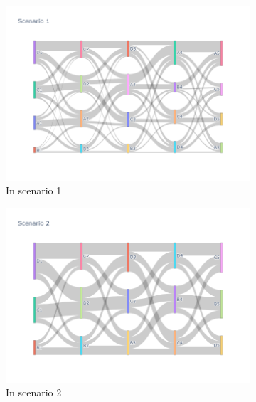 \iffalse
\begin{figure}[h]
  \begin{subfigure}{0.5\textwidth}
    \centering
    \includegraphics[width=\textwidth]{Figure/Figure26a.jpg}
    \caption{In scenario 1}
    \label{fig26a}
  \end{subfigure}
  \begin{subfigure}{0.5\textwidth}
    \centering
    \includegraphics[width=\linewidth]{Figure/Figure26b.jpg}
    \caption{In scenario 2}
    \label{fig26b}
  \end{subfigure}
  \begin{subfigure}{0.5\textwidth}
    \centering

\end{subfigure}
\end{figure}
